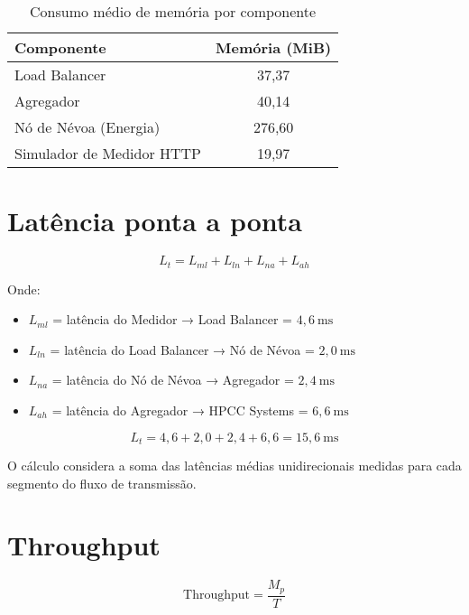 \begin{table}[htb]
    \caption{\label{tab:memoria}Consumo médio de memória por componente}
    \centering
    \begin{tabular}{|l|c|}
        \hline
            \textbf{Componente} & \textbf{Memória (MiB)} \\
        \hline
            Load Balancer & 37,37 \\
            Agregador & 40,14 \\
            Nó de Névoa (Energia) & 276,60 \\
            Simulador de Medidor HTTP & 19,97 \\
        \hline
    \end{tabular}
\end{table}

\section{Latência ponta a ponta}

\[
L_t = L_{ml} + L_{ln} + L_{na} + L_{ah}
\]

Onde:  
\begin{itemize}
    \item \(L_{ml}\) = latência do Medidor → Load Balancer = \(4{,}6\ \text{ms}\)
    \item \(L_{ln}\) = latência do Load Balancer → Nó de Névoa = \(2{,}0\ \text{ms}\)
    \item \(L_{na}\) = latência do Nó de Névoa → Agregador = \(2{,}4\ \text{ms}\)
    \item \(L_{ah}\) = latência do Agregador → HPCC Systems = \(6{,}6\ \text{ms}\)
\end{itemize}

\[
L_t = 4{,}6 + 2{,}0 + 2{,}4 + 6{,}6 = 15{,}6 \ \text{ms}
\]

O cálculo considera a soma das latências médias unidirecionais medidas para cada segmento do fluxo de transmissão.

\section{Throughput}

\[
\text{Throughput} = \frac{M_p}{T}
\]

